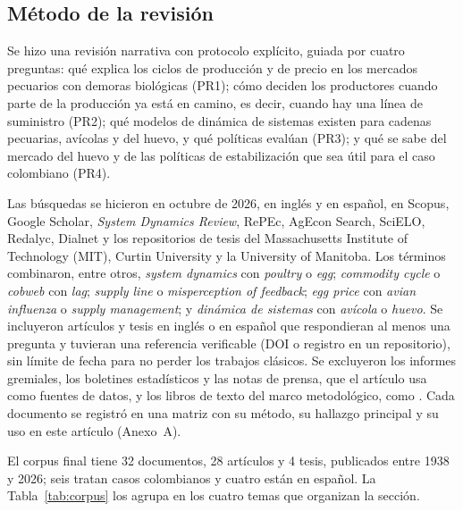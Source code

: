 \documentclass[preprint,12pt,authoryear]{elsarticle}
\begin{document}
\subsection{Método de la revisión}
\label{sec2.1}

Se hizo una revisión narrativa con protocolo explícito, guiada por cuatro preguntas: qué explica los ciclos de producción y de precio en los mercados pecuarios con demoras biológicas (PR1); cómo deciden los productores cuando parte de la producción ya está en camino, es decir, cuando hay una línea de suministro (PR2); qué modelos de dinámica de sistemas existen para cadenas pecuarias, avícolas y del huevo, y qué políticas evalúan (PR3); y qué se sabe del mercado del huevo y de las políticas de estabilización que sea útil para el caso colombiano (PR4).

Las búsquedas se hicieron en octubre de 2026, en inglés y en español, en Scopus, Google Scholar, \textit{System Dynamics Review}, RePEc, AgEcon Search, SciELO, Redalyc, Dialnet y los repositorios de tesis del Massachusetts Institute of Technology (MIT), Curtin University y la University of Manitoba. Los términos combinaron, entre otros, \textit{system dynamics} con \textit{poultry} o \textit{egg}; \textit{commodity cycle} o \textit{cobweb} con \textit{lag}; \textit{supply line} o \textit{misperception of feedback}; \textit{egg price} con \textit{avian influenza} o \textit{supply management}; y \textit{dinámica de sistemas} con \textit{avícola} o \textit{huevo}. Se incluyeron artículos y tesis en inglés o en español que respondieran al menos una pregunta y tuvieran una referencia verificable (DOI o registro en un repositorio), sin límite de fecha para no perder los trabajos clásicos. Se excluyeron los informes gremiales, los boletines estadísticos y las notas de prensa, que el artículo usa como fuentes de datos, y los libros de texto del marco metodológico, como \citet{Sterman2000}. Cada documento se registró en una matriz con su método, su hallazgo principal y su uso en este artículo (Anexo~A).

El corpus final tiene 32 documentos, 28 artículos y 4 tesis, publicados entre 1938 y 2026; seis tratan casos colombianos y cuatro están en español. La Tabla~\ref{tab:corpus} los agrupa en los cuatro temas que organizan la sección.
\end{document}
